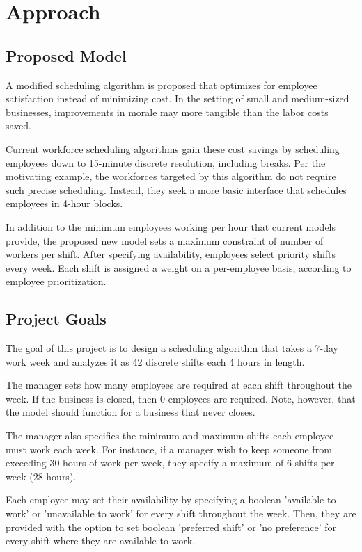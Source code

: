 \chapter{Approach}
\section{Proposed Model}
A modified scheduling algorithm is proposed that optimizes for employee satisfaction instead of minimizing cost. In the setting of small and medium-sized businesses, improvements in morale may more tangible than the labor costs saved.

Current workforce scheduling algorithms gain these cost savings by scheduling employees down to 15-minute discrete resolution, including breaks. Per the motivating example, the workforces targeted by this algorithm do not require such precise scheduling. Instead, they seek a more basic interface that schedules employees in 4-hour blocks. 

In addition to the minimum employees working per hour that current models  provide, the proposed new model sets a maximum constraint of number of workers per shift. After specifying availability, employees select priority shifts every week. Each shift is assigned a weight on a per-employee basis, according to employee prioritization.

\section{Project Goals}

The goal of this project is to design a scheduling algorithm that takes a 7-day work week and analyzes it as 42 discrete shifts each 4 hours in length. 

The manager sets how many employees are required at each shift throughout the week. If the business is closed, then 0 employees are required. Note, however, that the model should function for a business that never closes. 

The manager also specifies the minimum and maximum shifts each employee must work each week. For instance, if a manager wish to keep someone from exceeding 30 hours of work per week, they specify a maximum of 6 shifts per week (28 hours).

Each employee may set their availability by specifying a boolean 'available to work' or 'unavailable to work' for every shift throughout the week. Then, they are provided with the option to set boolean 'preferred shift' or 'no preference' for every shift where they are available to work. 

